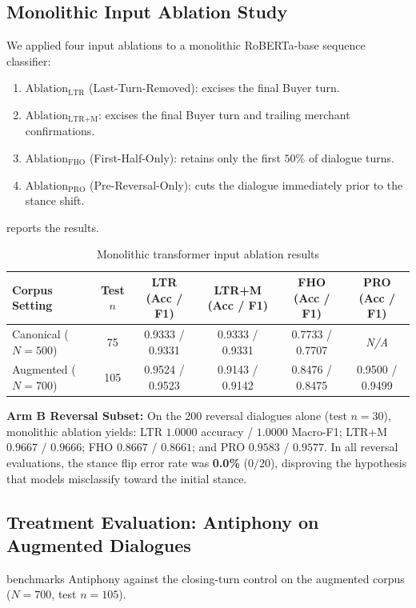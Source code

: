 \subsection{Monolithic Input Ablation Study}
We applied four input ablations to a monolithic RoBERTa-base sequence classifier:
\begin{enumerate}
  \item $\text{Ablation}_{\text{LTR}}$ (Last-Turn-Removed): excises the final Buyer turn.
  \item $\text{Ablation}_{\text{LTR+M}}$: excises the final Buyer turn and trailing merchant confirmations.
  \item $\text{Ablation}_{\text{FHO}}$ (First-Half-Only): retains only the first $50\%$ of dialogue turns.
  \item $\text{Ablation}_{\text{PRO}}$ (Pre-Reversal-Only): cuts the dialogue immediately prior to the stance shift.
\end{enumerate}

 reports the results.

\begin{table}[htbp]
  \centering
  \small
  \caption{Monolithic transformer input ablation results}
  \label{tab:ablation-results}
  \begin{tabularx}{\textwidth}{lccccc}
    \toprule
    \textbf{Corpus Setting} & \textbf{Test $n$} & \textbf{LTR (Acc / F1)} & \textbf{LTR+M (Acc / F1)} & \textbf{FHO (Acc / F1)} & \textbf{PRO (Acc / F1)} \\
    \midrule
    Canonical ($N=500$) & 75 & 0.9333 / 0.9331 & 0.9333 / 0.9331 & 0.7733 / 0.7707 & \textit{N/A} \\
    \rowcolor{lightbg}
    Augmented ($N=700$) & 105 & 0.9524 / 0.9523 & 0.9143 / 0.9142 & 0.8476 / 0.8475 & 0.9500 / 0.9499 \\
    \bottomrule
  \end{tabularx}
\end{table}

\textbf{Arm B Reversal Subset:} On the 200 reversal dialogues alone (test $n=30$), monolithic ablation yields: LTR $1.0000$ accuracy / $1.0000$ Macro-F1; LTR+M $0.9667$ / $0.9666$; FHO $0.8667$ / $0.8661$; and PRO $0.9583$ / $0.9577$. In all reversal evaluations, the stance flip error rate was \textbf{0.0\%} ($0/20$), disproving the hypothesis that models misclassify toward the initial stance.

\subsection{Treatment Evaluation: Antiphony on Augmented Dialogues}
 benchmarks Antiphony against the closing-turn control on the augmented corpus ($N=700$, test $n=105$).

